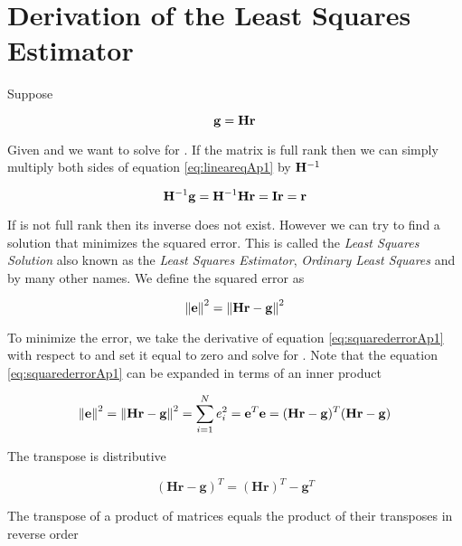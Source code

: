 \chapter{Derivation of the Least Squares Estimator}\label{app:Derivation of the Least Squares Estimator}


Suppose 

\begin{equation}\label{eq:lineareqAp1}
	\mathbf{g} = \mathbf{Hr} 
\end{equation}

Given  and  we want to solve for . If the matrix is full rank then we can simply multiply both sides of equation \ref{eq:lineareqAp1} by $\mathbf{H}^{-1}$ 

\begin{equation}
	\mathbf{H}^{-1} \mathbf{g} = \mathbf{H}^{-1} \mathbf{Hr} = \mathbf{I} \mathbf{r} = \mathbf{r}
\end{equation}

If  is not full rank then its inverse does not exist. However we can try to find a solution  that minimizes the squared error. This is called the \emph{Least Squares Solution} also known as the \emph{Least Squares Estimator}, \emph{Ordinary Least Squares} and by many other names. We define the squared error as

\begin{equation}\label{eq:squarederrorAp1}
	\mathbf{ \lVert \mathbf{e} \rVert }^2 =    \mathbf{ \lVert \mathbf{Hr-g} \rVert }^2
\end{equation}

\noindent To minimize the error, we take the derivative of equation \ref{eq:squarederrorAp1} with respect to  and set it equal to zero and solve for . Note that the equation \ref{eq:squarederrorAp1} can be expanded in terms of an inner product 

\begin{equation} \label{eq:squarederrorAp2}
	\mathbf{ \lVert \mathbf{e} \rVert }^2 =    \mathbf{ \lVert \mathbf{Hr-g} \rVert }^2 = \sum_{i=1}^{N} e_i^{2} = \mathbf{e}^T \mathbf{e} =(\mathbf{Hr-g} ) ^{T} ( \mathbf{Hr-g} )
\end{equation}

\noindent The transpose is distributive 

\begin{equation}
	 ( \mathbf{Hr-g} )^{T} = ( \mathbf{Hr} )^{T} - \mathbf{g}^{T} 
\end{equation}

\noindent The transpose of a product of matrices equals the product of their transposes in reverse order

